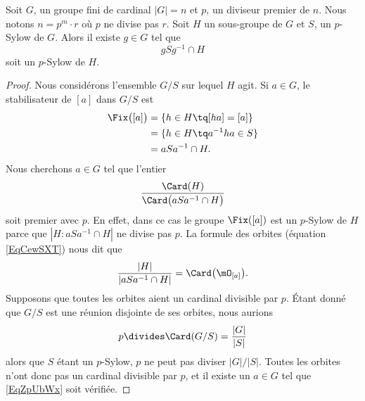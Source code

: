 \begin{lemma}       \label{LemwDYQMg}
	Soit \( G\), un groupe fini de cardinal \( | G |=n\) et \( p\), un diviseur premier de \( n\). Nous notons \( n=p^m\cdot r\) où \( p\) ne divise pas \( r\). Soit \( H\) un sous-groupe de \( G\) et \( S\), un \( p\)-Sylow de \( G\). Alors il existe \( g\in G\) tel que
	\begin{equation}
		gSg^{-1}\cap H
	\end{equation}
	soit un \( p\)-Sylow de \( H\).
\end{lemma}

\begin{proof}
	Nous considérons l'ensemble \( G/S\) sur lequel \( H\) agit. Si \( a\in G\), le stabilisateur de \( [a]\) dans \( G/S\) est
	\begin{subequations}
		\begin{align}
			\Fix\big( [a] \big) & =\{ h\in H\tq [ha]=[a] \}     \\
			                    & =\{ h\in H\tq a^{-1}ha\in S\} \\
			                    & =aSa^{-1}\cap H.
		\end{align}
	\end{subequations}
	Nous cherchons \( a\in G\) tel que l'entier
	\begin{equation}        \label{EqZpUbWx}
		\frac{ \Card(H) }{ \Card\big( aSa^{-1}\cap H \big) }
	\end{equation}
	soit premier avec \( p\). En effet, dans ce cas le groupe \( \Fix([a])\) est un $p$-Sylow de \( H\) parce que \( | H:aSa^{-1}\cap H |\) ne divise pas \( p\). La formule des orbites (équation \eqref{EqCewSXT}) nous dit que
	\begin{equation}
		\frac{ | H | }{ | aSa^{-1}\cap H | }=\Card\big( \mO_{[a]} \big).
	\end{equation}
	Supposons que toutes les orbites aient un cardinal divisible par \( p\). Étant donné que \( G/S\) est une réunion disjointe de ses orbites, nous aurions
	\begin{equation}
		p\divides \Card(G/S)=\frac{ | G | }{ | S | }
	\end{equation}
	alors que \( S\) étant un $p$-Sylow, \( p\) ne peut pas diviser \( | G |/| S |\). Toutes les orbites n'ont donc pas un cardinal divisible par \( p\), et il existe un \( a\in G\) tel que \eqref{EqZpUbWx} soit vérifiée.
\end{proof}


